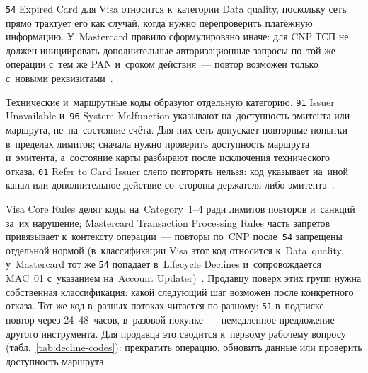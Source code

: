 \texttt{54} Expired Card для Visa относится к~категории Data quality, поскольку
сеть прямо трактует его как случай, когда нужно перепроверить платёжную
информацию. У~Mastercard правило сформулировано иначе: для CNP ТСП не должен
инициировать дополнительные авторизационные запросы по~той же операции с~тем же
PAN и~сроком действия~--- повтор возможен только с~новыми
реквизитами~\cite{visa-core-rules,mc-tpr}.

Технические и~маршрутные коды образуют отдельную категорию. \texttt{91} Issuer Unavailable
и~\texttt{96} System Malfunction указывают на~доступность эмитента или маршрута,
не~на~состояние счёта. Для них сеть допускает повторные попытки в~пределах
лимитов; сначала нужно проверить доступность маршрута и~эмитента, а~состояние карты разбирают после исключения технического отказа.
\texttt{01} Refer to Card Issuer слепо повторять нельзя: код указывает на~иной
канал или дополнительное действие со~стороны держателя либо
эмитента~\cite{visa-core-rules}.

Visa Core Rules делят коды на~Category~1--4 ради лимитов повторов
и~санкций за~их нарушение; Mastercard Transaction Processing Rules часть
запретов привязывает к~контексту операции~--- повторы по~CNP после~\texttt{54}
запрещены отдельной нормой (в~классификации Visa этот код относится
  к~Data~quality, у~Mastercard тот же \texttt{54} попадает в~Lifecycle Declines
  и~сопровождается MAC~01 с~указанием на~Account
Updater)~\cite{visa-core-rules,mc-tpr}. Продавцу поверх этих групп нужна
собственная классификация: какой следующий шаг возможен после конкретного
отказа. Тот же код в~разных потоках
читается по-разному: \texttt{51} в~подписке~--- повтор через 24--48~часов,
в~разовой покупке~--- немедленное предложение другого инструмента.
Для продавца это сводится к~первому рабочему вопросу
(табл.~\ref{tab:decline-codes}): прекратить операцию, обновить данные
или проверить доступность маршрута.

